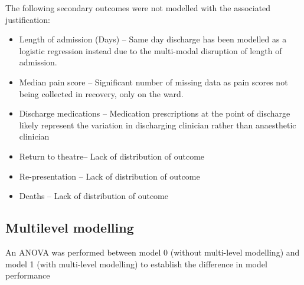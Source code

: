 \documentclass[
  letterpaper,
  DIV=11,
  numbers=noendperiod]{scrreprt}
\begin{document}
The following secondary outcomes were not modelled with the associated
justification:

\begin{itemize}
\item
  Length of admission (Days) -- Same day discharge has been modelled as
  a logistic regression instead due to the multi-modal disruption of
  length of admission.
\item
  Median pain score -- Significant number of missing data as pain scores
  not being collected in recovery, only on the ward.
\item
  Discharge medications -- Medication prescriptions at the point of
  discharge likely represent the variation in discharging clinician
  rather than anaesthetic clinician
\item
  Return to theatre-- Lack of distribution of outcome
\item
  Re-presentation -- Lack of distribution of outcome
\item
  Deaths -- Lack of distribution of outcome
\end{itemize}

\subsection{Multilevel modelling}\label{multilevel-modelling}

An ANOVA was performed between model 0 (without multi-level modelling)
and model 1 (with multi-level modelling) to establish the difference in
model performance

\begin{stbl}


\caption{\label{stbl-model-anova}\textbf{ANOVA of Model 0 and Model 1.}}

\end{stbl}%
\end{document}
